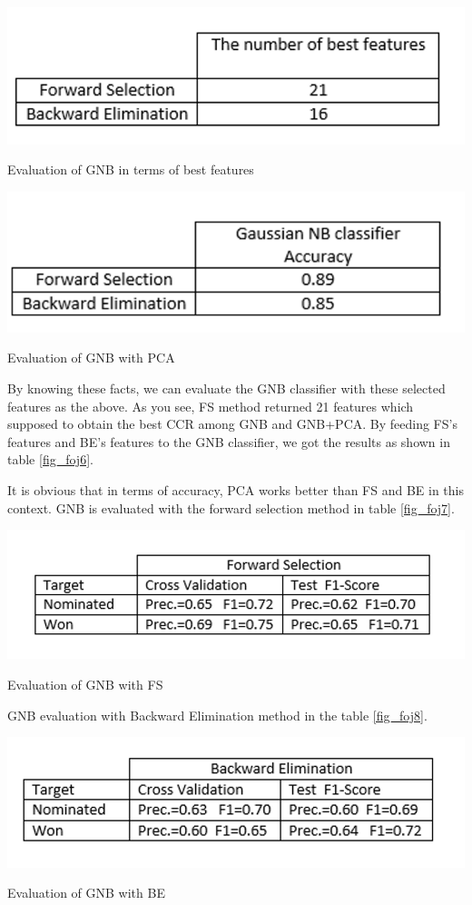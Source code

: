 \documentclass[journal,transmag]{IEEEtran}
\begin{document}
\begin{table}
\includegraphics[scale=.35]{foj5}
 \caption{Evaluation of GNB in terms of best features}
\label{fig_foj5}
\end{table}

\begin{table}
\includegraphics[scale=.4]{foj6}
 \caption{Evaluation of GNB with PCA}
\label{fig_foj6}
\end{table}
By knowing these facts, we can evaluate the GNB classifier with these selected features as the above. As you see, FS method returned 21 features which supposed to obtain the best CCR among GNB and GNB+PCA. By feeding FS's features and BE's features to the GNB classifier, we got the results as shown in table \ref{fig_foj6}.

It is obvious that in terms of accuracy, PCA works better than FS and BE in this context. GNB is evaluated with the forward selection method in table \ref{fig_foj7}.

\begin{table}
\includegraphics[scale=.35]{foj7}
 \caption{Evaluation of GNB with FS}
\label{fig_foj7}
\end{table}
GNB evaluation with Backward Elimination method in the table \ref{fig_foj8}.


\begin{table}
\includegraphics[scale=.35]{foj8}
 \caption{Evaluation of GNB with BE}
\label{fig_foj8}
\end{table}
\end{document}

